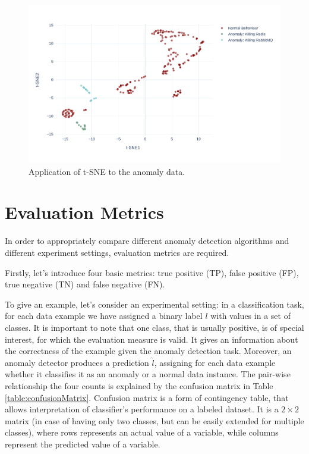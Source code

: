 \begin{figure}[!h]
    \centering
    \includegraphics[width=\textwidth]{img/tsne-anomalies-vs-normal.pdf}
    \caption{Application of t-SNE to the anomaly data.}
    \label{fig:tsne-anomalies}
\end{figure}

\section{Evaluation Metrics}
\label{section:evaluationMetrics}
In order to appropriately compare different anomaly detection algorithms and different experiment settings, evaluation metrics are required.

Firstly, let's introduce four basic metrics: true positive (TP), false positive (FP), true negative (TN) and false negative (FN). 

To give an example, let's consider an experimental setting: in a classification task, for each data example we have assigned a binary label $l$ with values in a set of classes. It is important to note that one class, that is usually positive, is of special interest, for which the evaluation measure is valid. It gives an information about the correctness of the example given the anomaly detection task. Moreover, an anomaly detector produces a prediction $\hat{l}$, assigning for each data example whether it classifies it as an anomaly or a normal data instance. The pair-wise relationship the four counts is explained by the confusion matrix in Table \ref{table:confusionMatrix}. Confusion matrix is a form of contingency table, that allows interpretation of classifier's performance on a labeled dataset. It is a $2 \times 2$ matrix (in case of having only two classes, but can be easily extended for multiple classes), where rows represents an actual value of a variable, while columns represent the predicted value of a variable.

